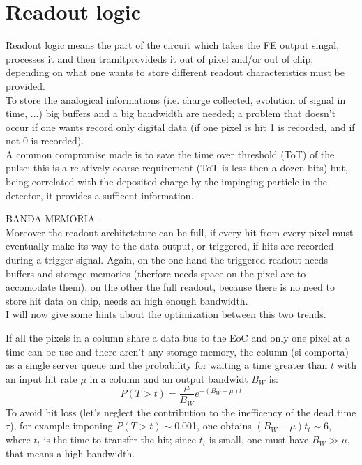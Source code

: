 \section{Readout logic}
Readout logic means the part of the circuit which takes the FE output singal, processes it and then tramitprovideds it out of pixel and/or out of chip; depending on what one wants to store different readout characteristics must be provided. \\
To store the analogical informations (i.e. charge collected, evolution of signal in time, ...) big buffers and a big bandwidth are needed; a problem that doesn't occur if one wants record only digital data (if one pixel is hit 1 is recorded, and if not 0 is recorded).\\
A common compromise made is to save the time over threshold (ToT) of the pulse; this is a relatively coarse requirement (ToT is less then a dozen bits) but, being correlated with the deposited charge by the impinging particle in the detector, it provides a sufficent information.

BANDA-MEMORIA-\\
Moreover the readout architetcture can be full, if every hit from every pixel must eventually
make its way to the data output, or triggered, if hits are recorded during a trigger signal.
Again, on the one hand the triggered-readout needs buffers and storage memories
(therfore needs space on the pixel are to accomodate them), on the other the full readout,
because there is no need to store hit data on chip, needs an high enough bandwidth.\\
I will now give some hints about the optimization between this two trends.

If all the pixels in a column share a data bus to the EoC and only one pixel at a time can
be use and there aren't any storage memory, the column (si comporta) as a single
server queue and the probability for waiting a time greater than $t$ with an input
hit rate $\mu$ in a column and an output bandwidt $B_W$ is:
\begin{equation}
P(T > t) = \frac{\mu}{B_W} e^{-( B_W-\mu )t}
\end{equation}
To avoid hit loss (let's neglect the contribution to the inefficency of the dead
time $\tau$), for example imponing $P(T > t)\sim$0.001, one obtains
$(B_W -\mu)t_t\sim$6, where $t_t$ is the time to transfer the hit;
since $t_t$ is small, one must have $B_W \gg \mu$, that means a high bandwidth.

